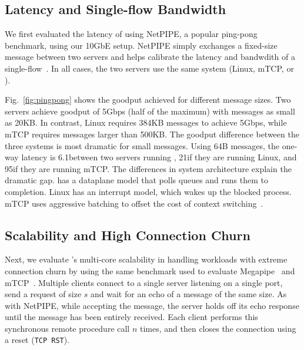 \subsection{Latency and Single-flow Bandwidth}
\label{sec:eval:netpipe}

We first evaluated the latency of \ix using NetPIPE, a popular
ping-pong benchmark, using our 10GbE setup.  NetPIPE simply exchanges
a fixed-size message between two servers and helps calibrate the
latency and bandwdith of a single-flow~\cite{snell1996netpipe}.  In
all cases, the two servers use the same system (Linux, mTCP, or \ix).


Fig.~\ref{fig:pingpong} shows the goodput achieved for
different message sizes.  Two \ix servers achieve goodput of 5Gbps
(half of the maximum) with messages as small as 20KB. In
contrast, Linux requires 384KB messages to achieve 5Gbps, while
mTCP requires messages larger than 500KB. The goodput difference
between the three systems is most dramatic for small messages. Using
64B messages, the one-way latency is 6.1\microsecond between two
servers running \ix, 21\microsecond if they are running Linux, and
95\microsecond if they are running mTCP.  The differences in system
architecture explain the dramatic gap. \ix has a dataplane model
that polls queues and runs them to completion. Linux has an interrupt
model, which wakes up the blocked process. mTCP uses aggressive
batching to offset the cost of context switching~\cite{jeong2014mtcp}.


\subsection{Scalability and High Connection Churn}
\label{sec:eval:short}

%

Next, we evaluate \ix's multi-core scalability in handling workloads
with extreme connection churn by using the same benchmark used to
evaluate Megapipe~\cite{han2012megapipe} and
mTCP~\cite{jeong2014mtcp}. Multiple clients connect to a single server
listening on a single port, send a request of size $s$ and wait for an
echo of a message of the same size.  As with NetPIPE, while accepting
the message, the server holds off its echo response until the message
has been entirely received.  Each client performs this synchronous
remote procedure call $n$ times, and then closes the connection using a
reset (\texttt{TCP RST}).  


